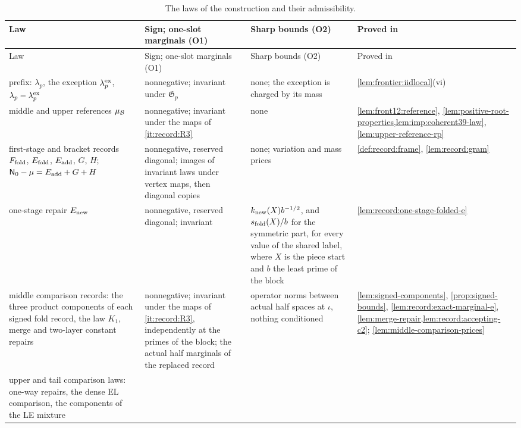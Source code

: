 {\small
\setlength{\LTpre}{6pt}\setlength{\LTpost}{6pt}
\begin{longtable}{@{}>{\raggedright\arraybackslash}p{3.45cm}%
>{\raggedright\arraybackslash}p{4.4cm}%
>{\raggedright\arraybackslash}p{3.65cm}%
>{\raggedright\arraybackslash}p{3.15cm}@{}}
\caption{The laws of the construction and their admissibility.}\label{tab:admissibility}\\
\toprule
Law & Sign; one-slot marginals (O1) & Sharp bounds (O2) & Proved in\\
\midrule
\endfirsthead
\toprule
Law & Sign; one-slot marginals (O1) & Sharp bounds (O2) & Proved in\\
\midrule
\endhead
\bottomrule
\endfoot
prefix: $\lambda_p$, the exception $\lambda^{\rm ex}_p$, $\lambda_p-\lambda^{\rm ex}_p$
& nonnegative; invariant under $\mathfrak G_p$
& none; the exception is charged by its mass
& \cref{lem:frontier:iidlocal}(vi)\\
middle and upper references $\mu_{\mathcal B}$
& nonnegative; invariant under the maps of \ref{it:record:R3}
& none
& \cref{lem:front12:reference}, \cref{lem:positive-root-properties,lem:imp:coherent39-law},
 \cref{lem:upper-reference-rp}\\
first-stage and bracket records $F_{\rm fold}$, $E_{\rm fold}$, $E_{\rm add}$,
 $G$, $H$; $\mathsf N_0-\mu=E_{\rm add}+G+H$
& nonnegative, reserved diagonal; images of invariant laws under vertex maps,
 then diagonal copies
& none; variation and mass prices
& \cref{def:record:frame}, \cref{lem:record:gram}\\
one-stage repair $E_{\rm new}$
& nonnegative, reserved diagonal; invariant
& $k_{\rm new}(X)b^{-1/2}$, and $s_{\rm fold}(X)/b$ for the symmetric part, for
 every value of the shared label, where $X$ is the piece start and $b$ the
least prime of the block
& \cref{lem:record:one-stage-folded-e}\\
middle comparison records: the three product components of each signed fold
 record, the law $K_1$, merge and two-layer constant repairs
& nonnegative; invariant under the maps of \ref{it:record:R3}, independently
 at the primes of the block; the actual half marginals of the replaced record
& operator norms between actual half spaces at $\iota$, nothing conditioned
& \cref{lem:signed-components}, \cref{prop:signed-bounds},
 \cref{lem:record:exact-marginal-e}, \cref{lem:merge-repair,lem:record:accepting-c2};
 \cref{lem:middle-comparison-prices}\\
upper and tail comparison laws: one-way repairs, the dense EL comparison, the
 components of the LE mixture

\end{longtable}}
